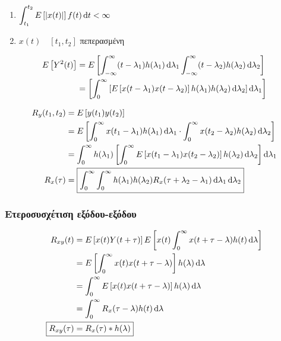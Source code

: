 \documentclass[11pt,a4paper,notitlepage,fleqn,draft]{article}
\begin{document}
\begin{enumerate}
	\item \( \displaystyle
	\int_{t_1}^{t_2} E\left[\left|x(t)\right|\right]f(t)\mathop{}\!\mathrm{d} t
	< \infty
	 \)
	\item \( x(t)\quad [t_1,t_2] \) πεπερασμένη
\end{enumerate}

\begin{align*}
	E\left[Y^2(t)\right] &= E\left[
	\int_{-\infty}^{\infty} (t-\lambda_1)h(\lambda_1)\mathop{}\!\mathrm{d}\lambda_1
	\int_{-\infty}^{\infty} (t-\lambda_2)h(\lambda_2)\mathop{}\!\mathrm{d}\lambda_2
	\right]
	\\ &= \left[
	\int_{0}^{\infty} \left[
	        E\left[
	            x(t-\lambda_1)x(t-\lambda_2)
	        \right] h(\lambda_1)h(\lambda_2)\mathop{}\!\mathrm{d}\lambda_2
	    \right] \mathop{}\!\mathrm{d}\lambda_1
	\right]
\end{align*}

\begin{align*}
	R_y(t_1,t_2) &= E\left[y(t_1)y(t_2)\right]
	\\ &= E\left[\int_{0}^{\infty}
	x(t_1-\lambda_1)h(\lambda_1)\mathop{}\!\mathrm{d}\lambda_1
	\cdot
	\int_{0}^{\infty} x(t_2-\lambda_2)h(\lambda_2)\mathop{}\!\mathrm{d}\lambda_2
	\right]
	\\ &= \int_{0}^{\infty}
	h(\lambda_1)\left[\int_{0}^{\infty}
	E\left[x(t_1-\lambda_1)x(t_2-\lambda_2)
	\right]h(\lambda_2)\mathop{}\!\mathrm{d}\lambda_2
	\right]\mathop{}\!\mathrm{d}\lambda_1 \\
	R_x(\tau) &= \boxed{
	    \int_{0}^{\infty}
	    \int_{0}^{\infty}
	    h(\lambda_1)h(\lambda_2)
	    R_x(\tau+\lambda_2-\lambda_1)\mathop{}\!\mathrm{d}\lambda_1\mathop{}\!\mathrm{d}\lambda_2
    }
\end{align*}

\subsubsection{Ετεροσυσχέτιση εξόδου-εξόδου}
\begin{align*}
	R_{xy}(t) &= E\left[x(t)Y(t+\tau)\right]
	E\left[x(t)
	\int_{0}^{\infty} x(t+\tau - \lambda)h(t)\dif\lambda
	\right]
	\\ &= E\left[
	\int_{0}^{\infty} x(t) x(t+\tau-\lambda)
	\right] h(\lambda)\dif\lambda
	\\ &= \int_{0}^{\infty} E\left[
	x(t)x(t+\tau - \lambda)
	\right] h(\lambda) \dif\lambda
	\\ &= \int_{0}^{\infty}
	R_x (\tau - \lambda)h(t)\dif\lambda
	\\
	\Aboxed{R_{xy}(\tau) &= R_x(\tau) * h(\lambda)}
\end{align*}
\end{document}
